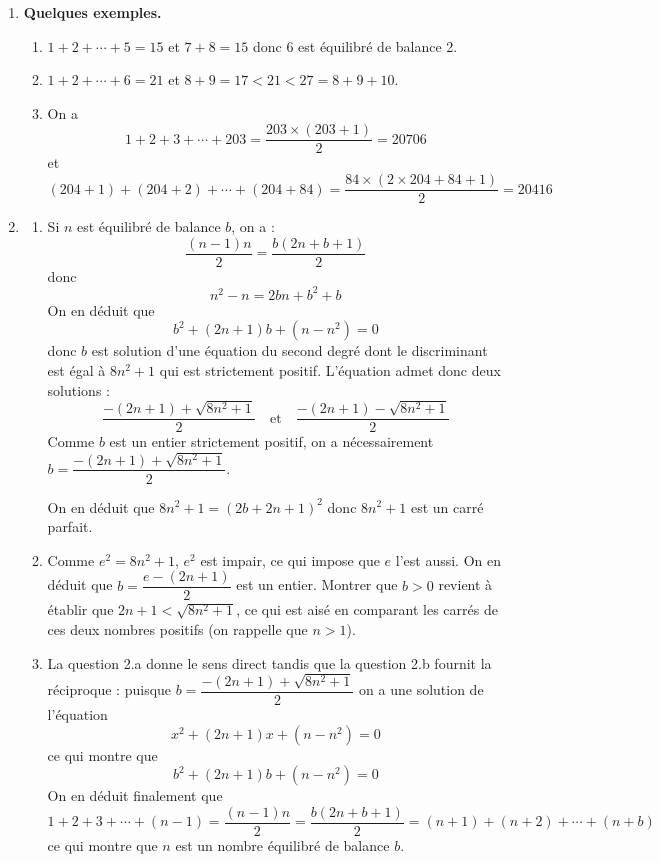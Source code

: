 \begin{enumerate}
\item \textbf{Quelques exemples.}
\begin{enumerate}
    \item $1 + 2 + \cdots + 5 = 15$ et $7 + 8 = 15$ donc 6 est équilibré de balance 2.
    
    \item $1 + 2 + \cdots + 6 = 21$ et $8 + 9 = 17 < 21 < 27 = 8 + 9 + 10$.
    
    \item On a
    \[1 + 2 + 3 + \cdots + 203 = \frac{203 \times (203 + 1)}{2} = 20706\]
    et
    \[(204 + 1) + (204 + 2) + \cdots + (204 + 84) = \frac{84 \times (2 \times 204 + 84 + 1)}{2} = 20416\]
\end{enumerate}

\item \textbf{}
\begin{enumerate}
    \item Si $n$ est équilibré de balance $b$, on a :
    \[\frac{(n - 1)n}{2} = \frac{b(2n + b + 1)}{2}\]
    donc
    \[n^2 - n = 2bn + b^2 + b\]
    On en déduit que
    \[b^2 + (2n + 1)b + (n - n^2) = 0\]
    donc $b$ est solution d'une équation du second degré dont le discriminant est égal à $8n^2 + 1$ qui est strictement positif. L'équation admet donc deux solutions :
    \[\frac{-(2n + 1) + \sqrt{8n^2 + 1}}{2} \quad \text{et} \quad \frac{-(2n + 1) - \sqrt{8n^2 + 1}}{2}\]
    Comme $b$ est un entier strictement positif, on a nécessairement $b = \dfrac{-(2n+1)+\sqrt{8n^2+1}}{2}$.
    
    On en déduit que $8n^2 + 1 = (2b + 2n + 1)^2$ donc $8n^2 + 1$ est un carré parfait.
    
    \item Comme $e^2 = 8n^2 + 1$, $e^2$ est impair, ce qui impose que $e$ l'est aussi. On en déduit que $b = \dfrac{e - (2n + 1)}{2}$ est un entier. Montrer que $b > 0$ revient à établir que $2n + 1 < \sqrt{8n^2 + 1}$, ce qui est aisé en comparant les carrés de ces deux nombres positifs (on rappelle que $n > 1$).
    
    \item La question 2.a donne le sens direct tandis que la question 2.b fournit la réciproque : puisque $b = \dfrac{-(2n+1)+\sqrt{8n^2+1}}{2}$ on a une solution de l'équation
    \[x^2 + (2n + 1)x + (n - n^2) = 0\]
    ce qui montre que
    \[b^2 + (2n + 1)b + (n - n^2) = 0\]
    On en déduit finalement que
    \[1 + 2 + 3 + \cdots + (n - 1) = \frac{(n - 1)n}{2} = \frac{b(2n + b + 1)}{2} = (n + 1) + (n + 2) + \cdots + (n + b)\]
    ce qui montre que $n$ est un nombre équilibré de balance $b$.
\end{enumerate}


\end{enumerate}
